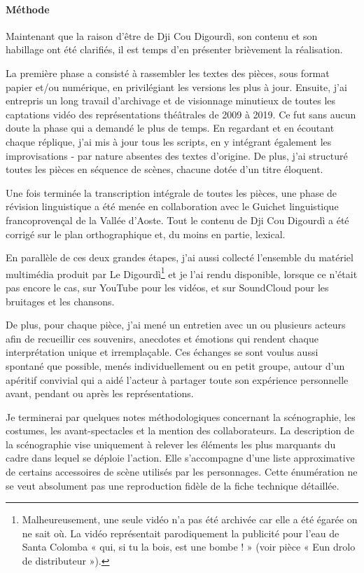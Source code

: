 \paragraph*{Méthode}
Maintenant que la raison d'être de Dji Cou Digourdì, son contenu et son habillage ont été clarifiés, il est temps d’en présenter brièvement la réalisation.

La première phase a consisté à rassembler les textes des pièces, sous format papier et/ou numérique, en privilégiant les versions les plus à jour. Ensuite, j'ai entrepris un long travail d’archivage et de visionnage minutieux de toutes les captations vidéo des représentations théâtrales de 2009 à 2019. Ce fut sans aucun doute la phase qui a demandé le plus de temps. En regardant et en écoutant chaque réplique, j'ai mis à jour tous les scripts, en y intégrant également les improvisations - par nature absentes des textes d’origine. De plus, j'ai structuré toutes les pièces en séquence de scènes, chacune dotée d’un titre éloquent.

Une fois terminée la transcription intégrale de toutes les pièces, une phase de révision linguistique a été menée en collaboration avec le Guichet linguistique francoprovençal de la Vallée d’Aoste. Tout le contenu de Dji Cou Digourdì a été corrigé sur le plan orthographique et, du moins en partie, lexical.

En parallèle de ces deux grandes étapes, j'ai aussi collecté l'ensemble du matériel multimédia produit par Le Digourdì\footnote{ Malheureusement, une seule vidéo n'a pas été archivée car elle a été égarée on ne sait où. La vidéo représentait parodiquement la publicité pour l'eau de Santa Colomba « qui, si tu la bois, est une bombe ! » (voir pièce « Eun drolo de distributeur »).} et je l'ai rendu disponible, lorsque ce n’était pas encore le cas, sur YouTube \href{https://www.youtube.com/@the_digourdi}{\yt} pour les vidéos, et sur SoundCloud \href{https://soundcloud.com/user-234168361/sets}{\pppp} pour les bruitages et les chansons.

De plus, pour chaque pièce, j'ai mené un entretien avec un ou plusieurs acteurs afin de recueillir ces souvenirs, anecdotes et émotions qui rendent chaque interprétation unique et irremplaçable. Ces échanges se sont voulus aussi spontané que possible, menés individuellement ou en petit groupe, autour d'un apéritif convivial qui a aidé l'acteur à partager toute son expérience personnelle avant, pendant ou après les représentations.

Je terminerai par quelques notes méthodologiques concernant la scénographie, les costumes, les avant-spectacles et la mention des collaborateurs.
La description de la scénographie vise uniquement à relever les éléments les plus marquants du cadre dans lequel se déploie l’action. Elle s’accompagne d’une liste approximative de certains accessoires de scène utilisés par les personnages. Cette énumération ne se veut absolument pas une reproduction fidèle de la fiche technique détaillée.

